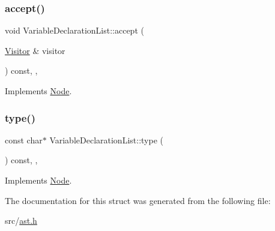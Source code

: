 \subsubsection{\texorpdfstring{accept()}{accept()}}
{\footnotesize\ttfamily void Variable\+Declaration\+List\+::accept (\begin{DoxyParamCaption}\item[{\hyperlink{struct_visitor}{Visitor} \&}]{visitor }\end{DoxyParamCaption}) const\hspace{0.3cm}{\ttfamily [inline]}, {\ttfamily [override]}, {\ttfamily [virtual]}}



Implements \hyperlink{struct_node_a10bd7af968140bbf5fa461298a969c71}{Node}.

\mbox{\label{struct_variable_declaration_list_abef74b3fa377e47f0b4585b13fd43fbc}} 
\subsubsection{\texorpdfstring{type()}{type()}}
{\footnotesize\ttfamily const char$\ast$ Variable\+Declaration\+List\+::type (\begin{DoxyParamCaption}{ }\end{DoxyParamCaption}) const\hspace{0.3cm}{\ttfamily [inline]}, {\ttfamily [override]}, {\ttfamily [virtual]}}



Implements \hyperlink{struct_node_a82f29420d0a38efcc370352528e94e9b}{Node}.



The documentation for this struct was generated from the following file\+:\begin{DoxyCompactItemize}
\item 
src/\hyperlink{ast_8h}{ast.\+h}\end{DoxyCompactItemize}
